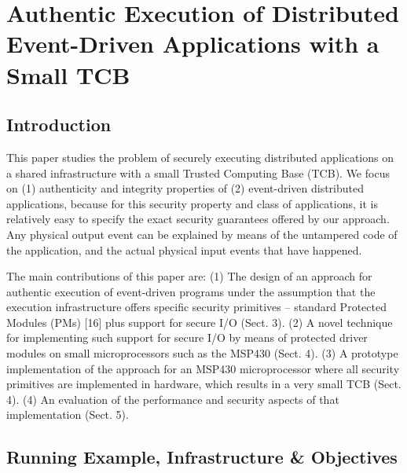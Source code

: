 \documentclass{article}
\begin{document}
\section{Authentic Execution of Distributed Event-Driven Applications with a Small TCB}

\subsection{Introduction}

This paper studies the problem of securely executing distributed applications on a shared infrastructure with a small Trusted Computing Base (TCB). We focus on (1) authenticity and integrity properties of (2) event-driven distributed applications, because for this security property and class of applications, it is relatively easy to specify the exact security guarantees offered by our approach. Any physical output event can be explained by means of the untampered code of the application, and the actual physical input events that have happened.
\medskip

The main contributions of this paper are: (1) The design of an approach for authentic execution of event-driven programs under the assumption that the execution infrastructure offers specific security primitives – standard Protected Modules (PMs) [16] plus support for secure I/O (Sect. 3). (2) A novel technique for implementing such support for secure I/O by means of protected driver modules on small microprocessors such as the MSP430 (Sect. 4). (3) A prototype implementation of the approach for an MSP430 microprocessor where all security primitives are implemented in hardware, which results in a very small TCB (Sect. 4). (4) An evaluation of the performance and security aspects of that implementation (Sect. 5).

\subsection{Running Example, Infrastructure \& Objectives}
\end{document}
